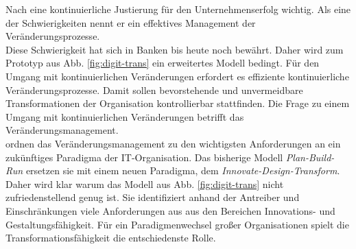 Nach \citet[S.30]{Bussmann2006} eine kontinuierliche Justierung für den Unternehmenserfolg wichtig. Als eine der Schwierigkeiten nennt er ein effektives Management der Veränderungsprozesse.
\medskip
\\
Diese Schwierigkeit hat sich in Banken bis heute noch bewährt.
Daher wird zum Prototyp aus Abb. \ref{fig:digit-trans} ein erweitertes Modell bedingt. Für den Umgang mit kontinuierlichen Veränderungen erfordert es effiziente kontinuierliche Veränderungsprozesse.
Damit sollen bevorstehende und unvermeidbare Transformationen der Organisation kontrollierbar stattfinden.
Die Frage zu einem Umgang mit kontinuierlichen Veränderungen betrifft das Veränderungsmanagement.
\medskip
\\
\citet[S. 184f]{Koch2016} ordnen das Veränderungsmanagement zu den wichtigsten Anforderungen an ein zukünftiges Paradigma der IT-Organisation. Das bisherige Modell \emph{Plan-Build-Run} ersetzen sie mit einem neuen Paradigma, dem \emph{Innovate-Design-Transform}.
\medskip
\\
Daher wird klar warum das Modell aus Abb. \ref{fig:digit-trans} nicht zufriedenstellend genug ist. Sie identifiziert anhand der Antreiber und Einschränkungen viele Anforderungen aus \cite[Tab. 11.1]{Koch2016} aus den Bereichen Innovations- und Gestaltungsfähigkeit. Für ein Paradigmenwechsel großer Organisationen spielt die Transformationsfähigkeit die entschiedenste Rolle.

